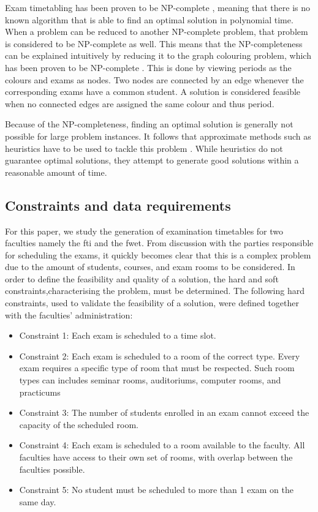 Exam timetabling has been proven to be NP-complete \cite{even1976}, meaning that there is no known algorithm that is able to find an optimal solution in polynomial time. When a problem can be reduced to another NP-complete problem, that problem is considered to be NP-complete as well. This means that the NP-completeness can be explained intuitively by reducing it to the graph colouring problem, which has been proven to be NP-complete \cite{karp1972}. This is done by viewing periods as the colours and exams as nodes. Two nodes are connected by an edge whenever the corresponding exams have a common student. A solution is considered feasible when no connected edges are assigned the same colour and thus period. 

Because of the NP-completeness, finding an optimal solution is generally not possible for large problem instances. It follows that approximate methods such as heuristics have to be used to tackle this problem \cite{farreny1986}. While heuristics do not guarantee optimal solutions, they attempt to generate good solutions within a reasonable amount of time.



\subsection{Constraints and data requirements}

For this paper, we study the generation of examination timetables for two faculties namely the \acrfull{fti} and the \acrfull{fwet}. From discussion with the parties responsible for scheduling the exams, it quickly becomes clear that this is a complex problem due to the amount of students, courses, and exam rooms to be considered. In order to define the feasibility and quality of a solution, the hard and soft constraints,characterising the problem, must be determined. The following hard constraints, used to validate the feasibility of a solution, were defined together with the faculties' administration:

\begin{itemize}
    \item Constraint 1: Each exam is scheduled to a time slot.
    \item Constraint 2: Each exam is scheduled to a room of the correct type. Every exam requires a specific type of room that must be respected. Such room types can includes seminar rooms, auditoriums, computer rooms, and practicums
    \item Constraint 3: The number of students enrolled in an exam cannot exceed the capacity of the scheduled room.
    \item Constraint 4: Each exam is scheduled to a room available to the faculty. All faculties have access to their own set of rooms, with overlap between the faculties possible.
    \item Constraint 5: No student must be scheduled to more than 1 exam on the same day.
\end{itemize}

